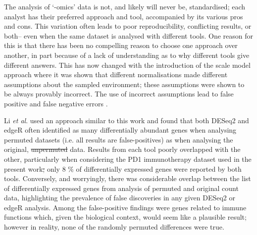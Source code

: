 \documentclass[10pt,letterpaper]{article}
\providecommand{\DIFaddtex}[1]{{\protect\color{blue}\uwave{#1}}} %
\providecommand{\DIFdeltex}[1]{{\protect\color{red}\sout{#1}}}                      %
\providecommand{\DIFaddbegin}{} %
\providecommand{\DIFaddend}{} %
\providecommand{\DIFdelbegin}{} %
\providecommand{\DIFdelend}{} %
\providecommand{\DIFadd}[1]{\texorpdfstring{\DIFaddtex{#1}}{#1}} %
\providecommand{\DIFdel}[1]{\texorpdfstring{\DIFdeltex{#1}}{}} %
\newcommand{\DIFscaledelfig}{0.5}
\newlength{\DIFdelgraphicswidth} %
\newlength{\DIFdelgraphicsheight} %
\newcommand{\DIFaddincludegraphics}[2][]{{\color{blue}\fbox{\DIFOincludegraphics[#1]{#2}}}} %
\newcommand{\DIFdelincludegraphics}[2][]{%
\sbox{\DIFdelgraphicsbox}{\DIFOincludegraphics[#1]{#2}}%
\settoboxwidth{\DIFdelgraphicswidth}{\DIFdelgraphicsbox} %
\settoboxtotalheight{\DIFdelgraphicsheight}{\DIFdelgraphicsbox} %
\scalebox{\DIFscaledelfig}{%
\parbox[b]{\DIFdelgraphicswidth}{\usebox{\DIFdelgraphicsbox}\\[-\baselineskip] \rule{\DIFdelgraphicswidth}{0em}}\llap{\resizebox{\DIFdelgraphicswidth}{\DIFdelgraphicsheight}{%
\setlength{\unitlength}{\DIFdelgraphicswidth}%
\begin{picture}(1,1)%
\thicklines\linethickness{2pt} %
{\color[rgb]{1,0,0}\put(0,0){\framebox(1,1){}}}%
{\color[rgb]{1,0,0}\put(0,0){\line( 1,1){1}}}%
{\color[rgb]{1,0,0}\put(0,1){\line(1,-1){1}}}%
\end{picture}%
}\hspace*{3pt}}} %
} %
\DeclareRobustCommand{\DIFaddbegin}{\DIFOaddbegin \let\includegraphics\DIFaddincludegraphics} %
\DeclareRobustCommand{\DIFaddend}{\DIFOaddend \let\includegraphics\DIFOincludegraphics} %
\DeclareRobustCommand{\DIFdelbegin}{\DIFOdelbegin \let\includegraphics\DIFdelincludegraphics} %
\DeclareRobustCommand{\DIFdelend}{\DIFOaddend \let\includegraphics\DIFOincludegraphics} %
\begin{document}
\DIFaddend The analysis of `-omics' data is not, and likely will never be, standardised; each analyst has their preferred approach and tool, accompanied by its various pros and cons. This variation often leads to poor reproducibility, conflicting results, or both-- even when the same dataset is analysed with different tools. One reason for this is that there has been no compelling reason to choose one approach over another, in part because of a lack of understanding as to why different tools give different answers. This has now changed with the introduction of the scale model approach \cite{nixon_scale_2024} where it was shown that different normalisations made different assumptions about the sampled environment; these assumptions were shown to be always provably incorrect. The use of incorrect assumptions lead to false positive and false negative errors \cite{nixon_scale_2024, nixon_incorporating_2025, gloor_explicit_2025, mcgovern_replacing_2025}.

Li \textit{et al}. \cite{li_exaggerated_2022} used an approach similar to this work and found that both DESeq2 and edgeR often identified as many differentially abundant genes when analysing permuted datasets (i.e. all results are false-positives) as when analysing the original, \DIFdelbegin \DIFdel{unpermuted }\DIFdelend \DIFaddbegin \DIFadd{non-permuted }\DIFaddend data. Results from each tool poorly overlapped with the other, particularly when considering the PD1 immunotherapy dataset used in the present work\DIFdelbegin \DIFdel{; }\DIFdelend \DIFaddbegin \DIFadd{: }\DIFaddend only 8 \% of differentially expressed genes were reported by both tools. Conversely, and worryingly, there was considerable overlap between the list of differentially expressed genes from analysis of permuted and original count data, highlighting the prevalence of false discoveries in any given DESeq2 or edgeR analysis. Among the false-positive findings were genes related to immune functions which, given the biological context, would seem like a plausible result; however in reality, none of the randomly permuted differences were true.
\end{document}
